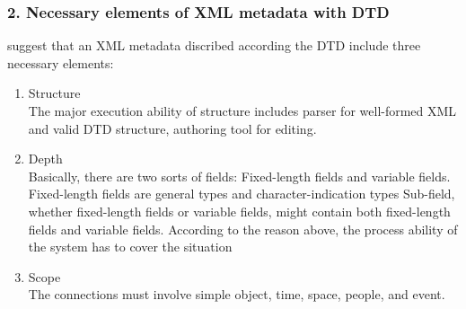 \documentclass[a4paper]{article} %
\begin{document}
\subsubsection*{2. Necessary elements of XML metadata with DTD}
\label{sec:mets}
{\bf\cite{Ruey-Shun:2003:DevelopinganXMLframeworkformetadatasystem}} suggest that an XML metadata discribed according the DTD include three necessary elements:
\begin{enumerate}
	\item Structure\\
	The major execution ability of structure includes parser for well-formed XML and
	valid DTD structure, authoring tool for editing.
	
	\item Depth\\
	Basically, there are two sorts of fields: Fixed-length fields and variable fields.
	Fixed-length fields are general types and character-indication types Sub-field, whether
	fixed-length fields or variable fields, might contain both fixed-length fields and
	variable fields. According to the reason above, the process ability of the system has to
	cover the situation
	
	\item Scope\\
	The connections must involve simple object, time, space, people, and event. 
\end{enumerate}


\end{document}
